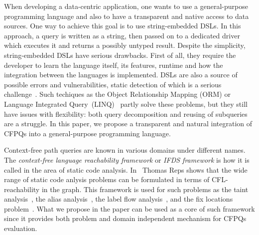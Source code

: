 When developing a data-centric application, one wants to use a general-purpose programming language and also to have a transparent and native access to data sources. 
One way to achieve this goal is to use string-embedded DSLs. 
In this approach, a query is written as a string, then passed on to a dedicated driver which executes it and returns a possibly untyped result.
Despite the simplicity, string-embedded DSLs have serious drawbacks. 
First of all, they require the developer to learn the language itself, its features, runtime and how the integration between the languages is implemented. 
DSLs are also a source of possible errors and vulnerabilities, static detection of which is a serious challenge~\cite{stringEmbeddedLanguagesProblem}. 
Such techiques as the Object Relationship Mapping (ORM) or Language Integrated Query~(LINQ)~\cite{LINQ1, LINQ2, LinqRDF} partly solve these problems, but they still have issues with flexibility: both query decomposition and  reusing of subqueries are a struggle. 
In this paper, we propose a transparent and natural integration of CFPQs into a general-purpose programming language.




Context-free path queries are known in various domains under different names. The \emph{context-free language reachability framework} or  \emph{IFDS framework} is how it is called in the area of static code analysis. 
In~\cite{Reps:1995, Reps} Thomas Reps shows that the wide range of static code anlysis problems can be formulated in terms of CFL-reachability in the graph. 
This framework is used for such problems as the taint analysis~\cite{CFLTaint}, the alias analysis~\cite{JavaCFL, Zheng, CFLGraspan}, the label flow analysis~\cite{LabelFlowCFLReachability}, and the fix locations problem~\cite{CFLfinding}.
What we propose in the paper can be used as a core of such framework since it provides both problem and domain independent mechanism for CFPQs evaluation. 

